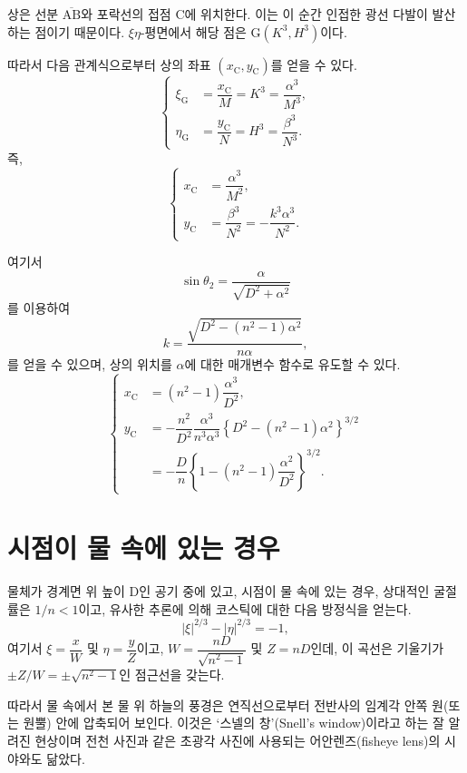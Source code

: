 \documentclass[twocolumn]{article}
\begin{document}
상은 선분 $\overline{\mathrm{AB}}$와 포락선의 접점 $\mathrm{C}$에 위치한다. 
이는 이 순간 인접한 광선 다발이 발산하는 점이기 때문이다. 
$\xi\eta$-평면에서 해당 점은 $\mathrm{G}(K^3, H^3)$이다.
	
따라서 다음 관계식으로부터 상의 좌표 $(x_{\mathrm{C}}^{}, y_{\mathrm{C}}^{})$를 얻을 수 있다.
$$ \left\{ 
\begin{aligned}
	\xi_{\mathrm{G}}^{} &= \dfrac{x_{\mathrm{C}}^{}}{M} = K^3 = \dfrac{\alpha^3}{M^3},\\
	\eta_{\mathrm{G}}^{} &= \dfrac{y_{\mathrm{C}}^{}}{N} = H^3 = \dfrac{\beta^3}{N^3}.
\end{aligned}
\right.$$
즉,
$$ \left\{ 
\begin{aligned}
	x_{\mathrm{C}}^{} &= \dfrac{\alpha^3}{M^2},\\
	y_{\mathrm{C}}^{} &= \dfrac{\beta^3}{N^2}=-\dfrac{k^3\alpha^3}{N^2}.
\end{aligned}
\right.$$

여기서
	$$\sin\theta_2 = \dfrac{\alpha}{\sqrt{D^2+\alpha^2}}$$
를 이용하여
$$k = \dfrac{\sqrt{D^2-(n^2-1)\alpha^2}}{n\alpha},$$
를 얻을 수 있으며, 
상의 위치를 $\alpha$에 대한 매개변수 함수로 유도할 수 있다.
$$ \left\{ 
\begin{aligned}
	x_{\mathrm{C}}^{} &= (n^2-1)\dfrac{\alpha^3}{D^2},\\
	y_{\mathrm{C}}^{} &= -\dfrac{n^2}{D^2}\dfrac{\alpha^3}
	{n^3\alpha^3}\left\{ D^2-(n^2-1)\alpha^2 \right\}^{3/2}\\
	&=-\dfrac{D}{n}\left\{ 1-(n^2-1)\dfrac{\alpha^2}{D^2} \right\}^{3/2}.
\end{aligned}
\right.$$
	
\section{시점이 물 속에 있는 경우}

물체가 경계면 위 높이 D인 공기 중에 있고, 
시점이 물 속에 있는 경우, 상대적인 굴절률은 $1/n < 1$이고, 
유사한 추론에 의해 코스틱에 대한 다음 방정식을 얻는다.
$$ \left| \xi \right|^{2/3} - \left| \eta \right|^{2/3} = -1, $$
여기서 $\xi = \dfrac{x}{W} $ 및 $\eta = \dfrac{y}{Z}$이고, 
$W = \dfrac{nD}{\sqrt{n^2-1}}$ 및 $Z = nD$인데,  이 곡선은 기울기가 
$\pm Z/W = \pm \sqrt{n^2-1}$인 점근선을 갖는다.

따라서 물 속에서 본 물 위 하늘의 풍경은
연직선으로부터 전반사의 임계각 안쪽 원(또는 원뿔) 안에 압축되어 보인다. 이것은 
`스넬의 창'(Snell's window)이라고 하는 잘 알려진 현상이며 전천 사진과 같은 초광각 
사진에 사용되는 어안렌즈(fisheye lens)의 시야와도 닮았다.
\end{document}
